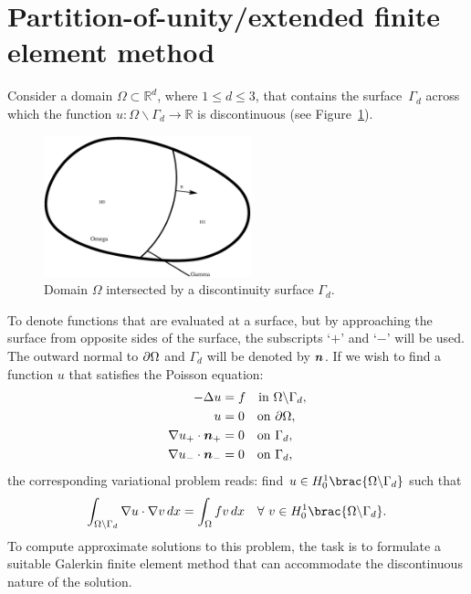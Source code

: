 \section{Partition-of-unity/extended finite element method}
%
Consider a domain $\Omega \subset \mathbb{R}^{d}$, where $1 \leq d \leq 3$,
that contains the surface~$\Gamma_{d}$ across which the function $u:
\Omega\backslash \Gamma_{d} \rightarrow \mathbb{R}$ is discontinuous
(see Figure~\ref{nikbakht:fig:domain}).
%
\begin{figure}
\begin{center}
  \includegraphics[width=6cm]{chapters/nikbakht/eps/domain.eps}
\end{center}
\caption{Domain $\Omega$ intersected by a discontinuity surface $\Gamma_{d}$.}
\label{nikbakht:fig:domain}
\end{figure}
%
To denote functions that are evaluated at a surface, but by approaching
the surface from opposite sides of the surface, the subscripts `$+$' and
`$-$' will be used. The outward normal to $\partial \Omega$ and $\Gamma_{d}$
will be denoted by $\boldsymbol{n}$.
If we wish to find a function $u$ that satisfies
the Poisson equation:
%
\begin{align}
  - \Delta u &= f \quad {\rm in} \ \Omega \backslash \Gamma_{d}, \\
           u &= 0 \quad {\rm on} \ \pd\Omega, \\
  \nabla u_{+} \cdot \vect{n}_{+} &= 0 \quad {\rm on} \ \Gamma_{d},\\
  \nabla u_{-} \cdot \vect{n}_{-} &= 0 \quad {\rm on} \ \Gamma_{d},
\end{align}
%
the corresponding variational problem reads:
find $u \in H_{0}^{1}\brac{\Omega\backslash\Gamma_{d}}$ such that
%
\begin{equation}
  \int_{\Omega\backslash\Gamma_{d}}  \nabla u \cdot \nabla v \dif x
      = \int_{\Omega} f v \dif x
\quad \forall \ v \in H_{0}^{1}\brac{\Omega\backslash\Gamma_{d}}.
\label{nikbakht:eqn:poisson_discontinuous_variational}
\end{equation}
%
To compute approximate solutions to this problem, the task is to formulate
a suitable Galerkin finite element method that can accommodate the
discontinuous nature of the solution.

